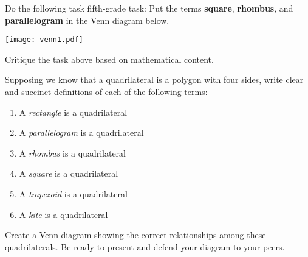 \documentclass[nooutcomes]{ximera}
\begin{document}
\begin{problem}
Do the following task fifth-grade task: Put the
terms \textbf{square}, \textbf{rhombus}, and \textbf{parallelogram} in
the Venn diagram below.  
\begin{image}
\texttt{[image: venn1.pdf]}
\end{image}
\end{problem}

\begin{problem} 
Critique the task above based on mathematical content.
\end{problem}

\newpage 
\begin{problem}
Supposing we know that a quadrilateral is a polygon with four sides, write clear and succinct definitions of each of the following terms: 
\begin{enumerate}
\itemsep18pt
\item A \textit{rectangle} is a quadrilateral 
\item A \textit{parallelogram} is a quadrilateral
\item A \textit{rhombus} is a quadrilateral
\item A \textit{square} is a quadrilateral
\item A \textit{trapezoid} is a quadrilateral
\item A \textit{kite} is a quadrilateral
\end{enumerate}
\end{problem}
\bigskip

\begin{problem} 
Create a Venn diagram showing the correct relationships
among these quadrilaterals. Be ready to present and defend your
diagram to your peers.
\end{problem}
\end{document}
